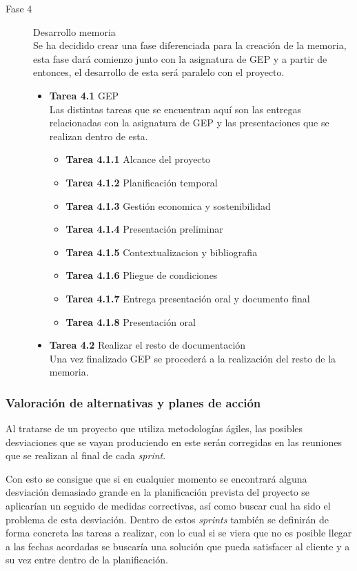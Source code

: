 \begin{description}
  \item[Fase 4] Desarrollo memoria\\
  Se ha decidido crear una fase diferenciada para la creación de la memoria, esta fase dará comienzo junto con la asignatura de GEP y a partir de entonces, el desarrollo de esta será paralelo con el proyecto.
    \begin{itemize}
        \item \textbf{Tarea 4.1} GEP\\
        Las distintas tareas que se encuentran aquí son las entregas relacionadas con la asignatura de GEP y las presentaciones que se realizan dentro de esta.
         \begin{itemize}
            \item \textbf{Tarea 4.1.1} Alcance del proyecto
            \item \textbf{Tarea 4.1.2} Planificación temporal
            \item \textbf{Tarea 4.1.3} Gestión economica y sostenibilidad
            \item \textbf{Tarea 4.1.4} Presentación preliminar
            \item \textbf{Tarea 4.1.5} Contextualizacion y bibliografia
            \item \textbf{Tarea 4.1.6} Pliegue de condiciones
            \item \textbf{Tarea 4.1.7} Entrega presentación oral y documento final
            \item \textbf{Tarea 4.1.8} Presentación oral
         \end{itemize}
        \item \textbf{Tarea 4.2} Realizar el resto de documentación\\
        Una vez finalizado GEP se procederá a la realización del resto de la memoria.
    \end{itemize}
\end{description}

\subsubsection{Valoración de alternativas y planes de acción}
Al tratarse de un proyecto que utiliza metodologías ágiles, las posibles desviaciones que se vayan produciendo en este serán corregidas en las reuniones que se realizan al final de cada \textit{sprint}.

Con esto se consigue que si en cualquier momento se encontrará alguna desviación demasiado grande en la planificación prevista del proyecto se aplicarían un seguido de medidas correctivas, así como buscar cual ha sido el problema de esta desviación. Dentro de estos \textit{sprints} también se definirán de forma concreta las tareas a realizar, con lo cual si se viera que no es posible llegar a las fechas acordadas se buscaría una solución que pueda satisfacer al cliente y a su vez entre dentro de la planificación.


